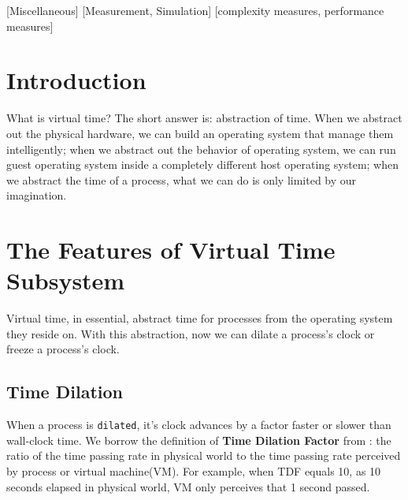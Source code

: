 \documentclass{acm_proc_article-sp}
\begin{document}
\date{30 July 1999}

\maketitle


[Miscellaneous]
[Measurement, Simulation]
[complexity measures, performance measures]



\section{Introduction}
What is virtual time? The short answer is: abstraction of time. When we abstract out the physical hardware, we can build an operating system that manage them intelligently; when we abstract out the behavior of operating system, we can run guest operating system inside a completely different host operating system; when we abstract the time of a process, what we can do is only limited by our imagination.

\section{The Features of Virtual Time Subsystem}
Virtual time, in essential, abstract time for processes from the operating system they reside on. With this abstraction, now we can dilate a process's clock or freeze a process's clock.

\subsection{Time Dilation}
When a process is \texttt{dilated}, it's clock advances by a factor faster or slower than wall-clock time. We borrow the definition of \textbf{Time Dilation Factor} from \cite{toinfinitybeyond}: the ratio of the time passing rate in physical world to the time passing rate perceived by process or virtual machine(VM). For example, when TDF equals 10, as 10 seconds elapsed in physical world, VM only perceives that 1 second passed. 
\end{document}
